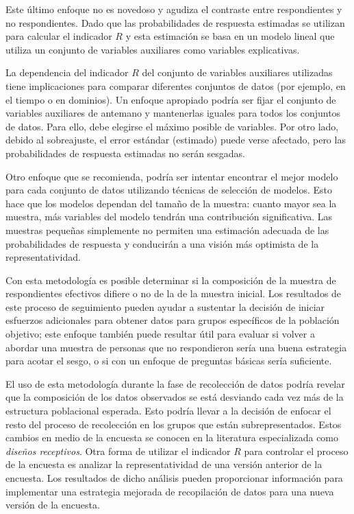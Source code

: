 \documentclass[
  12pt,
  spanish,
]{book}
\begin{document}
Este último enfoque no es novedoso y agudiza el contraste entre respondientes y no respondientes. Dado que las probabilidades de respuesta estimadas se utilizan para calcular
el indicador \(R\) y esta estimación se basa en un modelo lineal que utiliza un conjunto de variables auxiliares como variables explicativas.

La dependencia del indicador \(R\) del conjunto de variables auxiliares utilizadas tiene implicaciones para comparar diferentes conjuntos de datos (por ejemplo, en el tiempo o en dominios). Un enfoque apropiado podría ser fijar el conjunto de variables auxiliares de antemano y mantenerlas iguales para todos los conjuntos de datos. Para ello, debe elegirse el máximo posible de variables. Por otro lado, debido al sobreajuste, el error estándar (estimado) puede verse
afectado, pero las probabilidades de respuesta estimadas no serán sesgadas.

Otro enfoque que se recomienda, podría ser intentar encontrar el mejor modelo para cada conjunto de datos utilizando técnicas de selección de modelos. Esto hace que los modelos dependan del tamaño de la muestra: cuanto
mayor sea la muestra, más variables del modelo tendrán una contribución significativa. Las muestras pequeñas simplemente no permiten una estimación adecuada de las probabilidades de respuesta y conducirán a una visión más optimista de la representatividad.

Con esta metodología es posible determinar si la composición de la muestra de respondientes efectivos difiere o no de la de la muestra inicial. Los resultados de este proceso de seguimiento pueden ayudar a sustentar
la decisión de iniciar esfuerzos adicionales para obtener datos para grupos específicos de la población objetivo; este enfoque también puede resultar útil para evaluar si volver a abordar una muestra de personas que no respondieron sería una buena estrategia para acotar el sesgo, o si con un enfoque de preguntas básicas sería suficiente.

El uso de esta metodología durante la fase de recolección de datos podría revelar que la composición de los datos observados se está desviando cada vez más de la estructura poblacional esperada. Esto podría llevar a la decisión de enfocar el resto del proceso de recolección en los grupos que están subrepresentados. Estos cambios en medio de la encuesta se conocen en la literatura especializada como \emph{diseños receptivos}. Otra forma de utilizar el indicador \(R\) para controlar el proceso de la encuesta es analizar la representatividad de una versión anterior de la encuesta. Los resultados de dicho análisis pueden proporcionar información para implementar una estrategia mejorada de recopilación de datos para una nueva versión de la encuesta.
\end{document}
